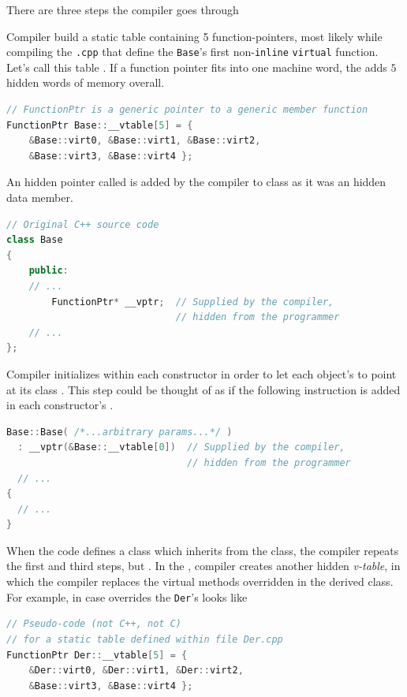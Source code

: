 There are three steps the compiler goes through

Compiler build a static table containing 5 function-pointers, most 
likely while compiling the \texttt{.cpp} that define the \texttt{Base}'s 
first non-\texttt{inline} \texttt{virtual} function. 
\newline
Let's call this table . 
If a function pointer fits into one machine word, the  
adds $5$ hidden words of memory overall.
\begin{lstlisting}[language=C++]
// FunctionPtr is a generic pointer to a generic member function
FunctionPtr Base::__vtable[5] = {
    &Base::virt0, &Base::virt1, &Base::virt2, 
    &Base::virt3, &Base::virt4 };
\end{lstlisting}

An hidden pointer called  is added by the compiler to 
 class as it was an hidden data member.

\begin{lstlisting}[language=C++]
// Original C++ source code
class Base 
{
    public:
    // ...
        FunctionPtr* __vptr;  // Supplied by the compiler, 
                              // hidden from the programmer
    // ...
};
\end{lstlisting}

Compiler initializes  within each 
constructor in order to let each object's  to point 
at its class . This step could be thought of as if 
the following instruction is added in each constructor's 
.
\begin{lstlisting}[language=C++]
Base::Base( /*...arbitrary params...*/ )
  : __vptr(&Base::__vtable[0])  // Supplied by the compiler, 
                                // hidden from the programmer
  // ...
{
  // ...
}
\end{lstlisting}

When the code defines a  class which inherits from the 
 class, the compiler repeats the first and third steps, 
but .
\newline
In the , compiler creates another hidden 
\textit{v-table}, in which the compiler replaces the virtual methods 
overridden in the derived class. For example, in case  
overrides  the \texttt{Der}'s 
 looks like
\begin{lstlisting}[language=C++]
// Pseudo-code (not C++, not C)
// for a static table defined within file Der.cpp
FunctionPtr Der::__vtable[5] = {
    &Der::virt0, &Der::virt1, &Der::virt2,
    &Base::virt3, &Base::virt4 };
\end{lstlisting}

